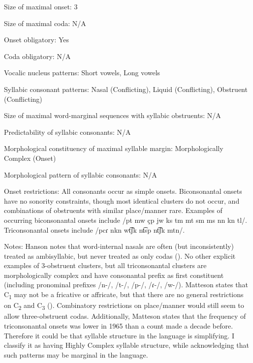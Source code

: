 {\begin{appendixdesc}
\item[Size of maximal onset:] 3

\item[Size of maximal coda:] N/A

\item[Onset obligatory:] Yes

\item[Coda obligatory:] N/A

\item[Vocalic nucleus patterns:] Short vowels, Long vowels

\item[Syllabic consonant patterns:] Nasal (Conflicting), Liquid (Conflicting), Obstruent (Conflicting)

\item[Size of maximal word-marginal sequences with syllabic obstruents:] N/A

\item[Predictability of syllabic consonants:] N/A

\item[Morphological constituency of maximal syllable margin:] Morphologically Complex (Onset)

\item[Morphological pattern of syllabic consonants:] N/A

\item[Onset restrictions:] All consonants occur as simple onsets. Biconsonantal onsets have no sonority constraints, though most identical clusters do not occur, and combinations of obstruents with similar place/manner rare. Examples of occurring biconsonantal onsets include /pt mw çp jw ks tm mt sm ms nn kn tl/. Triconsonantal onsets include /pcɾ nkn wt͡ʃk nt͡sp nt͡ʃk mtn/.

\item[Notes:] Hanson notes that word-internal nasals are often (but inconsistently) treated as ambisyllabic, but never treated as only codas (\citeyear[25]{Hanson2010}). No other explicit examples of 3-obstruent clusters, but all triconsonantal clusters are morphologically complex and have consonantal prefix as first constituent (including pronominal prefixes /n-/, /t-/, /p-/, /ɾ{}-/, /w-/). Matteson states that C\textsubscript{1} may not be a fricative or affricate, but that there are no general restrictions on C\textsubscript{2} and C\textsubscript{3} (\citeyear[29--30]{Matteson1965}). Combinatory restrictions on place/manner would still seem to allow three-obstruent codas. Additionally, Matteson states that the frequency of triconsonantal onsets was lower in 1965 than a count made a decade before. Therefore it could be that syllable structure in the language is simplifying. I classify it as having Highly Complex syllable structure, while acknowledging that such patterns may be marginal in the language.
\end{appendixdesc}
}
